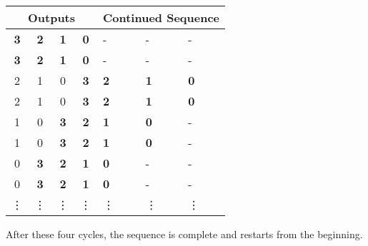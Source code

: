 \documentclass[a4paper, 12pt]{article}
\begin{document}
\begin{center}
\begin{tabular}{cccc|lll}
\multicolumn{4}{c}{Outputs} & \multicolumn{3}{c}{Continued Sequence} \\
\hline
\textbf{3} & \textbf{2} & \textbf{1} & \textbf{0} & - & - & - \\
\textbf{3} & \textbf{2} & \textbf{1} & \textbf{0} & - & - & - \\
\hline
2 & 1 & 0 & \textbf{3} & \textbf{2} & \textbf{1} & \textbf{0} \\
2 & 1 & 0 & \textbf{3} & \textbf{2} & \textbf{1} & \textbf{0} \\
\hline
1 & 0 & \textbf{3} & \textbf{2} & \textbf{1} & \textbf{0} & - \\
1 & 0 & \textbf{3} & \textbf{2} & \textbf{1} & \textbf{0} & - \\
\hline
0 & \textbf{3} & \textbf{2} & \textbf{1} & \textbf{0} & - & -\\
0 & \textbf{3} & \textbf{2} & \textbf{1} & \textbf{0} & - & -\\
\vdots & \vdots & \vdots & \vdots & \vdots & \vdots & \vdots \\
\end{tabular}
\end{center}

After these four cycles, the sequence is complete and restarts from the beginning.
\end{document}
